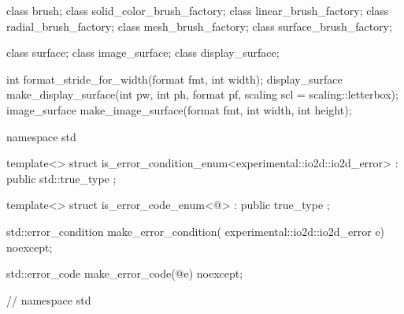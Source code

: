 \begin{codeblock}
{{{{  class brush;
  class solid_color_brush_factory;
  class linear_brush_factory;
  class radial_brush_factory;
  class mesh_brush_factory;
  class surface_brush_factory;
  
  class surface;
  class image_surface;
  class display_surface;
  
  int format_stride_for_width(format fmt, int width);
  display_surface make_display_surface(int pw, int ph, format pf,
    scaling scl = scaling::letterbox);
  image_surface make_image_surface(format fmt, int width, int height);
} } } }

namespace std {
	template<>
	struct is_error_condition_enum<experimental::io2d::io2d_error>
		: public std::true_type{ };

	template<>
	struct is_error_code_enum<@\impdef@>
		: public true_type{ };

	std::error_condition make_error_condition(
	  experimental::io2d::io2d_error e) noexcept;

	std::error_code make_error_code(@\impdef@ e) noexcept;
} // namespace std

\end{codeblock}
%
